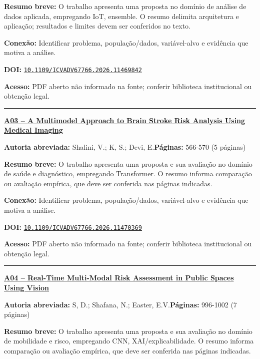 \documentclass[10pt,a4paper]{article}
\begin{document}
\textbf{Resumo breve:} O trabalho apresenta uma proposta no domínio de análise de dados aplicada, empregando IoT, ensemble. O resumo delimita arquitetura e aplicação; resultados e limites devem ser conferidos no texto.\par
\textbf{Conexão:} Identificar problema, população/dados, variável-alvo e evidência que motiva a análise.\par
\textbf{DOI:} \href{https://doi.org/10.1109/ICVADV67766.2026.11469842}{\nolinkurl{10.1109/ICVADV67766.2026.11469842}}\par
\textbf{Acesso:} PDF aberto não informado na fonte; conferir biblioteca institucional ou obtenção legal.\par
\noindent\rule{\textwidth}{0.35pt}
\par\medskip\noindent
{\large\bfseries\href{https://doi.org/10.1109/ICVADV67766.2026.11470369}{A03 -- A Multimodel Approach to Brain Stroke Risk Analysis Using Medical Imaging}}\par\smallskip
\textbf{Autoria abreviada:} Shalini, V.; K, S.; Devi, E.\quad \textbf{Páginas:} 566-570 (5 páginas)\par
\textbf{Resumo breve:} O trabalho apresenta uma proposta e sua avaliação no domínio de saúde e diagnóstico, empregando Transformer. O resumo informa comparação ou avaliação empírica, que deve ser conferida nas páginas indicadas.\par
\textbf{Conexão:} Identificar problema, população/dados, variável-alvo e evidência que motiva a análise.\par
\textbf{DOI:} \href{https://doi.org/10.1109/ICVADV67766.2026.11470369}{\nolinkurl{10.1109/ICVADV67766.2026.11470369}}\par
\textbf{Acesso:} PDF aberto não informado na fonte; conferir biblioteca institucional ou obtenção legal.\par
\noindent\rule{\textwidth}{0.35pt}
\par\medskip\noindent
{\large\bfseries\href{https://doi.org/10.1109/ICVADV67766.2026.11470323}{A04 -- Real-Time Multi-Modal Risk Assessment in Public Spaces Using Vision}}\par\smallskip
\textbf{Autoria abreviada:} S, D.; Shafana, N.; Easter, E.V.\quad \textbf{Páginas:} 996-1002 (7 páginas)\par
\textbf{Resumo breve:} O trabalho apresenta uma proposta e sua avaliação no domínio de mobilidade e risco, empregando CNN, XAI/explicabilidade. O resumo informa comparação ou avaliação empírica, que deve ser conferida nas páginas indicadas.\par
\end{document}

